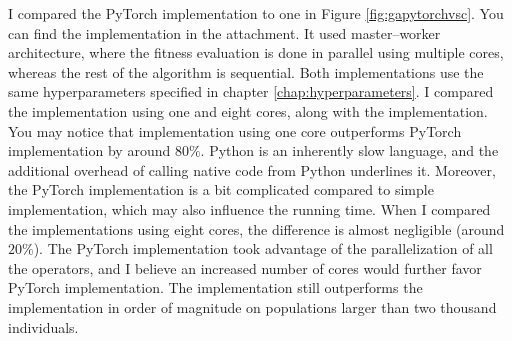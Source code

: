 I compared the PyTorch implementation to \cpp one in Figure \ref{fig:gapytorchvsc}. You can find the \cpp implementation in the attachment. It used master--worker architecture, where the fitness evaluation is done in parallel using multiple cores, whereas the rest of the algorithm is sequential. Both implementations use the same hyperparameters specified in chapter \ref{chap:hyperparameters}. I compared the implementation using one and eight cores, along with the \gpu implementation. You may notice that \cpp implementation using one core outperforms PyTorch implementation by around $80\%$. Python is an inherently slow language, and the additional overhead of calling native code from Python underlines it. Moreover, the PyTorch implementation is a bit complicated compared to simple \cpp implementation, which may also influence the running time. When I compared the implementations using eight cores, the difference is almost negligible (around $20\%$). The PyTorch implementation took advantage of the parallelization of all the operators, and I believe an increased number of cores would further favor PyTorch implementation. The \gpu implementation still outperforms the \cpp implementation in order of magnitude on populations larger than two thousand individuals.

